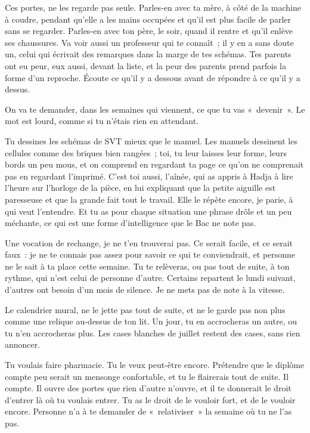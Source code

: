 \documentclass[10.5pt,twoside,openright]{book}
\begin{document}
Ces portes, ne les regarde pas seule. Parles-en avec ta mère, à côté de la machine à coudre, pendant qu’elle a les mains occupées et qu’il est plus facile de parler sans se regarder. Parles-en avec ton père, le soir, quand il rentre et qu’il enlève ses chaussures. Va voir aussi un professeur qui te connaît ; il y en a sans doute un, celui qui écrivait des remarques dans la marge de tes schémas. Tes parents ont eu peur, eux aussi, devant la liste, et la peur des parents prend parfois la forme d’un reproche. Écoute ce qu’il y a dessous avant de répondre à ce qu’il y a dessus.

On va te demander, dans les semaines qui viennent, ce que tu vas « devenir ». Le mot est lourd, comme si tu n’étais rien en attendant.

Tu dessines les schémas de SVT mieux que le manuel. Les manuels dessinent les cellules comme des briques bien rangées ; toi, tu leur laisses leur forme, leurs bords un peu mous, et on comprend en regardant ta page ce qu’on ne comprenait pas en regardant l’imprimé. C’est toi aussi, l’aînée, qui as appris à Hadja à lire l’heure sur l’horloge de la pièce, en lui expliquant que la petite aiguille est paresseuse et que la grande fait tout le travail. Elle le répète encore, je parie, à qui veut l’entendre. Et tu as pour chaque situation une phrase drôle et un peu méchante, ce qui est une forme d’intelligence que le Bac ne note pas.

Une vocation de rechange, je ne t’en trouverai pas. Ce serait facile, et ce serait faux : je ne te connais pas assez pour savoir ce qui te conviendrait, et personne ne le sait à ta place cette semaine. Tu te relèveras, ou pas tout de suite, à ton rythme, qui n’est celui de personne d’autre. Certains repartent le lundi suivant, d’autres ont besoin d’un mois de silence. Je ne mets pas de note à la vitesse.

Le calendrier mural, ne le jette pas tout de suite, et ne le garde pas non plus comme une relique au-dessus de ton lit. Un jour, tu en accrocheras un autre, ou tu n’en accrocheras plus. Les cases blanches de juillet restent des cases, sans rien annoncer.

Tu voulais faire pharmacie. Tu le veux peut-être encore. Prétendre que le diplôme compte peu serait un mensonge confortable, et tu le flairerais tout de suite. Il compte. Il ouvre des portes que rien d’autre n’ouvre, et il te donnerait le droit d’entrer là où tu voulais entrer. Tu as le droit de le vouloir fort, et de le vouloir encore. Personne n’a à te demander de « relativiser » la semaine où tu ne l’as pas.
\end{document}
